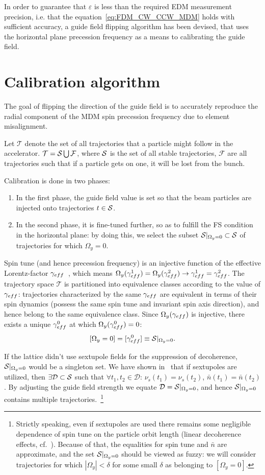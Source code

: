 \documentclass[a4paper]{jacow}
\newcommand{\W}{\Omega}
\newcommand{\Traj}{\mathcal T}
\newcommand{\Fail}{\mathcal F}
\newcommand{\D}{\mathcal D}
\newcommand{\nbar}{\bar n}
\begin{document}
In order to guarantee that $\varepsilon$ is less than the required EDM measurement precision, i.e. that the equation~\eqref{eq:FDM_CW_CCW_MDM} holds with sufficient accuracy, a guide field flipping algorithm has been devised, that uses the horizontal plane precession frequency as a means to calibrating the guide field. 

\section{Calibration algorithm}
The goal of flipping the direction of the guide field is to accurately reproduce the radial component
of the MDM spin precession frequency due to element misalignment.

Let $\Traj$ denote the set of all trajectories that a particle might follow in the accelerator.
$\Traj = \Stab \bigcup \Fail$, where $\Stab$ is the set of all stable trajectories, $\Fail$ are all trajectories
such that if a particle gets on one, it will be lost from the bunch.

Calibration is done in two phases:
\begin{enumerate}
\item In the first phase, the guide field value is set so that the beam particles are injected onto trajectories
  $t\in\Stab$.
\item In the second phase, it is fine-tuned further, so as to fulfill the FS condition in the horizontal plane:
  by doing this, we select the subset $\Stab*\subset\Stab$ of trajectories for which $\W_y = 0$.
\end{enumerate}

Spin tune (and hence precession frequency) is an injective function of the
effective Lorentz-factor $\g*$~\cite{Aksentev:DecohIPAC19}, which means
$\W_y(\g*^1) = \W_y(\g*^2) \rightarrow \g*^1 = \g*^2$. The trajectory space $\Traj$ is partitioned into equivalence
classes according to the value of $\g*$: trajectories characterized by the same $\g*$ are equivalent
in terms of their spin dynamics (possess the same spin tune and invariant spin axis direction),
and hence belong to the same equivalence class.
Since $\W_y(\g*)$ is injective, there exists a unique $\g*^0$ at which $\W_y(\g*^0)=0$:
\[
[\W_y=0] = [\g*^0] \equiv \Stab*.
\]

If the lattice didn't use sextupole fields for the suppression of decoherence,
$\Stab*$ would be a singleton set. We have shown in~\cite{Aksentev:DecohIPAC19} that if sextupoles are
utilized, then $\exists\D\subset\Stab$ such that $\forall t_1,t_2\in\D$:
$\nu_s(t_1) = \nu_s(t_2)$, $\nbar(t_1) = \nbar(t_2)$. By adjusting the guide field strength we equate
$\D=\Stab*$, and hence $\Stab*$ contains multiple trajectories.~\footnote{Strictly speaking,
  even if sextupoles are used there remains some negligible dependence of spin tune
  on the particle orbit length (linear decoherence effects, cf.~\cite{Aksentev:DecohIPAC19}).
  Because of that, the equalities for spin tune and $\nbar$ are approximate, and the set $\Stab*$
  should be viewed as fuzzy:
  we will consider trajectories for which $|\W_y|<\delta$ for some small $\delta$ as belonging to $[\W_y=0]$.}
\end{document}

